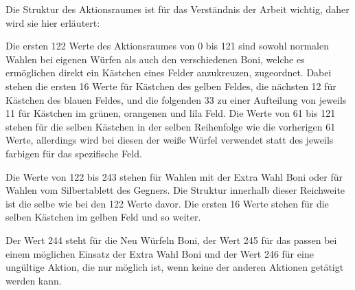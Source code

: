 Die Struktur des Aktionsraumes ist für das Verständnis der Arbeit wichtig, daher wird sie hier erläutert:

Die ersten 122 Werte des Aktionsraumes von 0 bis 121 sind sowohl normalen Wahlen bei eigenen Würfen als auch den verschiedenen Boni, welche es ermöglichen direkt ein Kästchen eines Felder anzukreuzen, zugeordnet. Dabei stehen die ersten 16 Werte für Kästchen des gelben Feldes, die nächsten 12 für Kästchen des blauen Feldes, und die folgenden 33 zu einer Aufteilung von jeweils 11 für Kästchen im grünen, orangenen und lila Feld. Die Werte von 61 bis 121 stehen für die selben Kästchen in der selben Reihenfolge wie die vorherigen 61 Werte, allerdings wird bei diesen der weiße Würfel verwendet statt des jeweils farbigen für das spezifische Feld.

Die Werte von 122 bis 243 stehen für Wahlen mit der Extra Wahl Boni oder für Wahlen vom Silbertablett des Gegners. Die Struktur innerhalb dieser Reichweite ist die selbe wie bei den 122 Werte davor. Die ersten 16 Werte stehen für die selben Kästchen im gelben Feld und so weiter.

Der Wert 244 steht für die Neu Würfeln Boni, der Wert 245 für das passen bei einem möglichen Einsatz der Extra Wahl Boni und der Wert 246 für eine ungültige Aktion, die nur möglich ist, wenn keine der anderen Aktionen getätigt werden kann.
